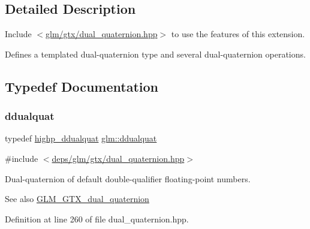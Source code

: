 \subsection{Detailed Description}
Include $<$\hyperlink{dual__quaternion_8hpp}{glm/gtx/dual\+\_\+quaternion.\+hpp}$>$ to use the features of this extension.

Defines a templated dual-\/quaternion type and several dual-\/quaternion operations. 

\subsection{Typedef Documentation}
\mbox{\label{group__gtx__dual__quaternion_ga373431ffdd82d5c03c258217a9e1f1a6}} 
\subsubsection{\texorpdfstring{ddualquat}{ddualquat}}
{\footnotesize\ttfamily typedef \hyperlink{group__gtx__dual__quaternion_ga83e4c5d27c8b0a264a3f3aed24f3f84e}{highp\+\_\+ddualquat} \hyperlink{group__gtx__dual__quaternion_ga373431ffdd82d5c03c258217a9e1f1a6}{glm\+::ddualquat}}



{\ttfamily \#include $<$\hyperlink{dual__quaternion_8hpp}{deps/glm/gtx/dual\+\_\+quaternion.\+hpp}$>$}

Dual-\/quaternion of default double-\/qualifier floating-\/point numbers.

\begin{DoxySeeAlso}{See also}
\hyperlink{group__gtx__dual__quaternion}{G\+L\+M\+\_\+\+G\+T\+X\+\_\+dual\+\_\+quaternion} 
\end{DoxySeeAlso}


Definition at line 260 of file dual\+\_\+quaternion.\+hpp.

\mbox{\label{group__gtx__dual__quaternion_ga2f6227b5f9dc08a2e7682065a84b3aa9}} 
